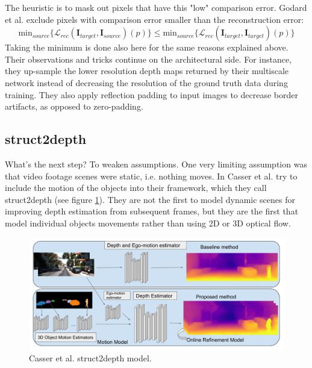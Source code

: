 The heuristic is to mask out pixels that have this "low" comparison error.
Godard et al. exclude pixels with comparison error smaller than the reconstruction error:
\[
	\text{min}_{source} \{ \mathcal{L}_{rec}(\mathbf{I}_{target}, \mathbf{I}_{source})(p) \}
		\leq
	\text{min}_{source} \{ \mathcal{L}_{rec}(\mathbf{I}_{target}, \hat{\mathbf{I}}_{target})(p) \}
\]
Taking the minimum is done also here for the same reasons explained above.
Their observations and tricks continue on the architectural side.
For instance, they up-sample the lower resolution depth maps returned by their multiscale network instead of decreasing the resolution of the ground truth data during training.
They also apply reflection padding to input images to decrease border artifacts, as opposed to zero-padding.

\subsection{struct2depth}
What's the next step? To weaken assumptions.
One very limiting assumption was that video footage scenes were static, i.e. nothing moves.
In \cite{struct2depth} Casser et al. try to include the motion of the objects into their framework, which they call struct2depth (see figure \ref{fig:struct2depth}).
They are not the first to model dynamic scenes for improving depth estimation from subsequent frames, but they are the first that model individual objects movements rather than using 2D or 3D optical flow.

\begin{figure}
	\centering
	\includegraphics[scale=0.3]{figs/struct2depth}
	\caption{Casser et al. struct2depth \cite{struct2depth} model. \label{fig:struct2depth}}
\end{figure}

